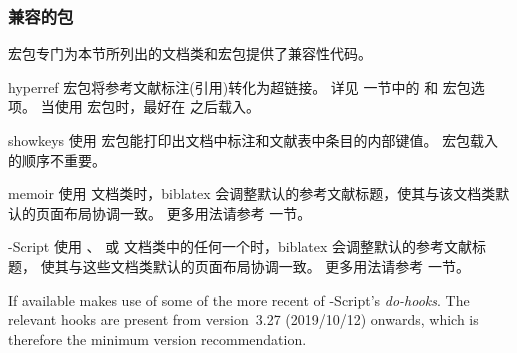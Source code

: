 \subsubsection{兼容的包}
\label{int:pre:cmp}


\biblatex 宏包专门为本节所列出的文档类和宏包提供了兼容性代码。

\begin{marglist}

\item[hyperref]
 宏包将参考文献标注(引用)转化为超链接。
详见   一节中的  和  宏包选项。
当使用  宏包时，最好在 \biblatex 之后载入。

\item[showkeys]
使用 宏包能打印出文档中标注和文献表中条目的内部键值。
宏包载入的顺序不重要。

\item[memoir]
使用  文档类时，biblatex 会调整默认的参考文献标题，使其与该文档类默认的页面布局协调一致。
更多用法请参考  一节。

\item[\acr{KOMA}-Script]
使用 、 或  文档类中的任何一个时，biblatex 会调整默认的参考文献标题，
使其与这些文档类默认的页面布局协调一致。
更多用法请参考  一节。

If available \biblatex makes use of some of the more recent of -Script's \emph{do-hooks}. The relevant hooks are present from version~3.27 (2019/10/12) onwards, which is therefore the minimum version recommendation.
\end{marglist}

